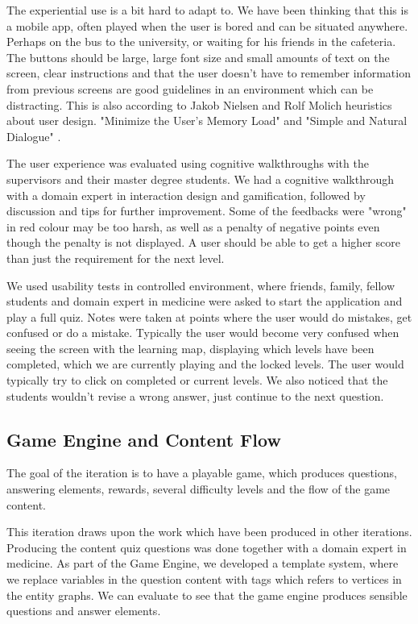 The experiential use is a bit hard to adapt to. We have been thinking that this is a mobile app, often played when the user is bored and can be situated anywhere. Perhaps on the bus to the university, or waiting for his friends in the cafeteria. The buttons should be large, large font size and small amounts of text on the screen, clear instructions and that the user doesn't have to remember information from previous screens are good guidelines in an environment which can be distracting. This is also according to Jakob Nielsen and Rolf Molich heuristics about user design. "Minimize the User’s Memory Load" and  "Simple and Natural Dialogue" \parencite{Molich1990}.

The user experience was evaluated using cognitive walkthroughs with the supervisors and their master degree students. We had a cognitive walkthrough with a domain expert in interaction design and gamification, followed by discussion and tips for further improvement. Some of the feedbacks were "wrong" in red colour may be too harsh, as well as a penalty of negative points even though the penalty is not displayed. A user should be able to get a higher score than just the requirement for the next level.

We used usability tests in controlled environment, where friends, family, fellow students and domain expert in medicine were asked to start the application and play a full quiz. Notes were taken at points where the user would do  mistakes, get confused or do a mistake. Typically the user would become very confused when seeing the screen with the learning map, displaying which levels have been completed, which we are currently playing and the locked levels. The user would typically try to click on completed or current levels. We also noticed that the students wouldn't revise a wrong answer, just continue to the next question.




\subsection{Game Engine and Content Flow}
The goal of the iteration is to have a playable game, which produces questions, answering elements, rewards, several difficulty levels and the flow of the game content.

This iteration draws upon the work which have been produced in other iterations. Producing the content quiz questions was done together with a domain expert in medicine. As part of the Game Engine, we developed a template system, where we replace variables in the question content with tags which refers to vertices in the entity graphs. We can evaluate to see that the game engine produces sensible questions and answer elements.

